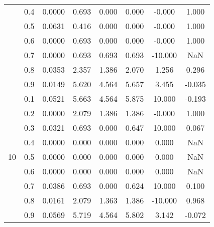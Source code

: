 \documentclass[11pt,a4paper]{report}
\begin{document}
\begin{longtable}{ | c | c || c | c | c | c | c | c | }
 & 0.4 & 0.0000 & 0.693 & 0.000 & 0.000 & -0.000 & 1.000 \\
 & 0.5 & 0.0631 & 0.416 & 0.000 & 0.000 & -0.000 & 1.000 \\
 & 0.6 & 0.0000 & 0.693 & 0.000 & 0.000 & -0.000 & 1.000 \\
 & 0.7 & 0.0000 & 0.693 & 0.693 & 0.693 & -10.000 & NaN \\
 & 0.8 & 0.0353 & 2.357 & 1.386 & 2.070 & 1.256 & 0.296 \\
 & 0.9 & 0.0149 & 5.620 & 4.564 & 5.657 & 3.455 & -0.035 \\
 \hline
\multirow{9}{*}{10} & 0.1 & 0.0521 & 5.663 & 4.564 & 5.875 & 10.000 & -0.193 \\
 & 0.2 & 0.0000 & 2.079 & 1.386 & 1.386 & -0.000 & 1.000 \\
 & 0.3 & 0.0321 & 0.693 & 0.000 & 0.647 & 10.000 & 0.067 \\
 & 0.4 & 0.0000 & 0.000 & 0.000 & 0.000 & 0.000 & NaN \\
 & 0.5 & 0.0000 & 0.000 & 0.000 & 0.000 & 0.000 & NaN \\
 & 0.6 & 0.0000 & 0.000 & 0.000 & 0.000 & 0.000 & NaN \\
 & 0.7 & 0.0386 & 0.693 & 0.000 & 0.624 & 10.000 & 0.100 \\
 & 0.8 & 0.0161 & 2.079 & 1.363 & 1.386 & -10.000 & 0.968 \\
 & 0.9 & 0.0569 & 5.719 & 4.564 & 5.802 & 3.142 & -0.072 \\
 \hline
\hline
\end{longtable}
\end{document}
